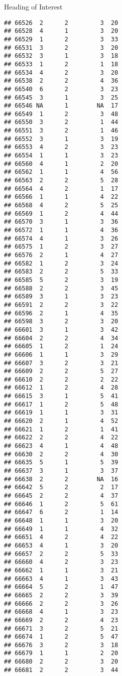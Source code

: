 \documentclass[
  ignorenonframetext,
]{beamer}
\begin{document}
\begin{frame}[fragile]{Heading of Interest}
\begin{verbatim}
## 66526  2      2         3  20
## 66528  4      1         3  20
## 66529  1      2         3  33
## 66531  3      2         3  20
## 66532  3      1         3  18
## 66533  1      2         1  18
## 66534  4      2         3  20
## 66538  2      2         4  36
## 66540  6      2         3  23
## 66545  3      1         3  25
## 66546 NA      1        NA  17
## 66549  1      2         3  48
## 66550  3      2         1  44
## 66551  3      2         1  46
## 66552  3      1         3  19
## 66553  4      2         3  23
## 66554  1      1         3  23
## 66560  4      1         2  20
## 66562  1      1         4  56
## 66563  2      2         5  28
## 66564  4      2         1  17
## 66566  1      1         4  22
## 66568  4      2         5  25
## 66569  1      2         4  44
## 66570  3      1         3  36
## 66572  1      1         4  36
## 66574  4      1         3  26
## 66575  1      2         3  27
## 66576  2      1         4  27
## 66582  1      2         3  24
## 66583  2      2         5  33
## 66585  5      2         3  19
## 66588  2      2         3  45
## 66589  3      1         3  23
## 66591  2      2         3  22
## 66596  2      1         4  35
## 66598  3      2         3  20
## 66601  3      1         3  42
## 66604  2      2         4  34
## 66605  1      2         1  24
## 66606  1      1         3  29
## 66607  3      2         3  21
## 66609  2      2         5  27
## 66610  2      2         2  22
## 66612  1      2         4  28
## 66615  3      1         5  41
## 66617  1      2         5  48
## 66619  1      1         3  31
## 66620  2      1         4  52
## 66621  1      2         1  41
## 66622  2      2         4  22
## 66623  4      1         4  48
## 66630  2      2         4  30
## 66635  5      1         5  39
## 66637  3      1         3  37
## 66638  2      2        NA  16
## 66642  5      2         2  17
## 66645  2      2         4  37
## 66646  1      2         5  61
## 66647  6      2         1  14
## 66648  1      1         3  20
## 66649  1      1         4  32
## 66651  4      2         4  22
## 66653  4      1         3  20
## 66657  2      2         5  33
## 66660  4      2         3  23
## 66662  1      1         3  21
## 66663  4      1         3  43
## 66664  5      2         1  47
## 66665  2      2         3  39
## 66666  2      2         3  26
## 66668  4      1         3  23
## 66669  2      2         4  23
## 66671  3      2         5  21
## 66674  1      2         5  47
## 66676  3      2         3  18
## 66679  1      1         2  20
## 66680  2      2         3  20
## 66681  2      2         3  44

\end{verbatim}
\end{frame}
\end{document}
